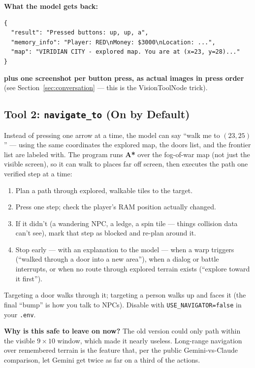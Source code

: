 \documentclass[11pt]{article}
\newcommand{\code}[1]{\texttt{#1}}
\begin{document}
\textbf{What the model gets back:}
\begin{verbatim}
{
  "result": "Pressed buttons: up, up, a",
  "memory_info": "Player: RED\nMoney: $3000\nLocation: ...",
  "map": "VIRIDIAN CITY - explored map. You are at (x=23, y=28)..."
}
\end{verbatim}
\textbf{plus one screenshot per button press, as actual images in press order} (see Section~\ref{sec:conversation} --- this is the VisionToolNode trick).

\subsection{Tool 2: \code{navigate\_to} (On by Default)}

Instead of pressing one arrow at a time, the model can say ``walk me to $(23, 25)$'' --- using the same coordinates the explored map, the doors list, and the frontier list are labeled with. The program runs \textbf{A*} over the fog-of-war map (not just the visible screen), so it can walk to places far off screen, then executes the path one verified step at a time:

\begin{enumerate}[nosep]
  \item Plan a path through explored, walkable tiles to the target.
  \item Press one step; check the player's RAM position actually changed.
  \item If it didn't (a wandering NPC, a ledge, a spin tile --- things collision data can't see), mark that step as blocked and re-plan around it.
  \item Stop early --- with an explanation to the model --- when a warp triggers (``walked through a door into a new area''), when a dialog or battle interrupts, or when no route through explored terrain exists (``explore toward it first'').
\end{enumerate}

Targeting a door walks through it; targeting a person walks up and faces it (the final ``bump'' is how you talk to NPCs). Disable with \code{USE\_NAVIGATOR=false} in your \code{.env}.

\textbf{Why is this safe to leave on now?} The old version could only path within the visible $9\times10$ window, which made it nearly useless. Long-range navigation over remembered terrain is the feature that, per the public Gemini-vs-Claude comparison, let Gemini get twice as far on a third of the actions.
\end{document}

